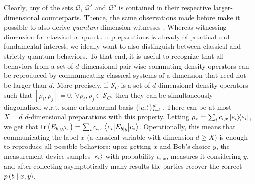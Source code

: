             Clearly, any of the sets $\mathcal{Q}$, $\mathcal{Q}^\lambda$ and $\mathcal{Q}^\rho$ is contained in their respective larger-dimensional counterparts. Thence, the same observations made before make it possible to also derive \emph{quantum} dimension witnesses \cite{gallego_pam_2010}. Whereas witnessing dimension for classical or quantum preparations is already of practical and fundamental interest, we ideally want to also distinguish between classical and strictly quantum behaviors. To that end, it is useful to recognize that all behaviors from a set of $d$-dimensional pair-wise commuting density operators can be reproduced by communicating classical systems of a dimension that need not be larger than $d$. More precisely, if $\mathcal{S}_C$ is a set of $d$-dimensional density operators such that $\left[ \rho_i, \rho_j \right] = 0, \,\forall \rho_i, \rho_j \in \mathcal{S}_C$, then they can be simultaneously diagonalized w.r.t. some orthonormal basis $\{ \ket{ e_i } \}_{i=1}^d$. There can be at most $X=d$ $d$-dimensional preparations with this property. Letting $\rho_x = \sum_i c_{i,x} \ketbra{e_i}{e_i}$, we get that $\text{tr}\left(  E_{b \mid y} \rho_x  \right) = \sum_i c_{i,x} \left\langle e_i \middle\vert E_{b \mid y} \middle\vert e_i \right\rangle$. Operationally, this means that communicating the label $x$ (a classical variable with dimension $d \geq X$) is enough to reproduce all possible behaviors: upon getting $x$ and Bob's choice $y$, the measurement device samples $\ket{e_i}$ with probability $c_{i,x}$, measures it considering $y$, and after collecting asymptotically many results the parties recover the correct $p \left( b \mid x,y \right)$.  
            
